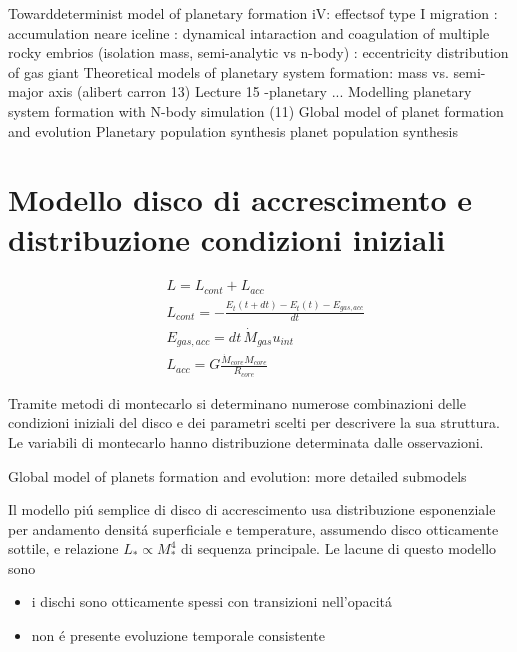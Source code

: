 \begin{workout}
Towarddeterminist model of planetary formation iV: effectsof type I migration
									: accumulation neare iceline
									: dynamical intaraction and coagulation of multiple rocky embrios (isolation mass, semi-analytic vs n-body)
									: eccentricity distribution of gas giant
Theoretical models of planetary system formation: mass vs. semi-major axis	(alibert carron 13)			Lecture 15 -planetary ...
Modelling planetary system formation with N-body simulation (11)
Global model of planet formation and evolution
Planetary population synthesis
planet population synthesis					
\end{workout}

\section{Modello disco di accrescimento e distribuzione condizioni iniziali}

\begin{workout}
\begin{align}
&L=L_{cont}+L_{acc}\\
&L_{cont}=-\frac{E_t(t+dt)-E_t(t)-E_{gas,acc}}{dt}\\
&E_{gas,acc}=dt\,\dot{M}_{gas}u_{int}\\
&L_{acc}=G\frac{\dot{M}_{core}M_{core}}{R_{core}}
\end{align}
\end{workout}

Tramite metodi di montecarlo si determinano numerose combinazioni delle condizioni iniziali del disco e dei parametri scelti per descrivere la sua struttura.
Le variabili di montecarlo hanno distribuzione determinata dalle osservazioni.

\begin{workout}
Global model of planets formation and evolution: more detailed submodels
\end{workout}

Il modello pi\'u semplice di disco di accrescimento usa distribuzione esponenziale per andamento densit\'a superficiale e temperature, assumendo disco otticamente sottile, e relazione $L_*\propto M_*^4$ di sequenza principale. Le lacune di questo modello sono
\begin{itemize}
\item i dischi sono otticamente spessi con transizioni nell'opacit\'a
\item non \'e presente evoluzione temporale consistente
\end{itemize}

